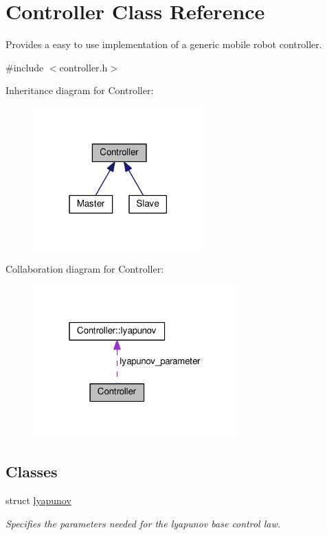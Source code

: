 \hypertarget{classController}{}\section{Controller Class Reference}
\label{classController}


Provides a easy to use implementation of a generic mobile robot controller.  




{\ttfamily \#include $<$controller.\+h$>$}



Inheritance diagram for Controller\+:\nopagebreak
\begin{figure}[H]
\begin{center}
\leavevmode
\includegraphics[width=186pt]{classController__inherit__graph}
\end{center}
\end{figure}


Collaboration diagram for Controller\+:\nopagebreak
\begin{figure}[H]
\begin{center}
\leavevmode
\includegraphics[width=223pt]{classController__coll__graph}
\end{center}
\end{figure}
\subsection*{Classes}
\begin{DoxyCompactItemize}
\item 
struct \hyperlink{structController_1_1lyapunov}{lyapunov}
\begin{DoxyCompactList}\small\item\em Specifies the parameters needed for the lyapunov base control law. \end{DoxyCompactList}\end{DoxyCompactItemize}

